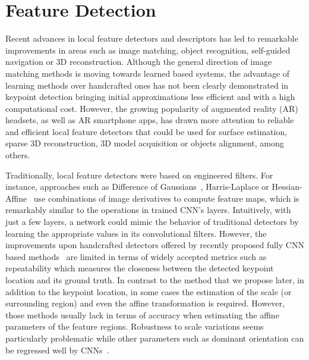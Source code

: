 \section{Feature Detection}
\label{sec:local_detectors}

Recent advances in local feature detectors and descriptors has led to remarkable improvements in areas such as image matching, object recognition, self-guided navigation or 3D reconstruction. Although the general direction of image matching methods is moving towards learned based systems, the advantage of learning methods over handcrafted ones has not been clearly demonstrated in keypoint detection \cite{Karel_Vedaldi_BMVC_18} bringing initial approximations less efficient and with a high computational cost.
However, the growing popularity of augmented reality (AR) headsets, as well as AR smartphone apps, has drawn more attention to reliable and efficient local feature detectors that could be used for surface estimation, sparse 3D reconstruction, 3D model acquisition or objects alignment, among others. \par

Traditionally, local feature detectors were based on engineered filters. For instance, approaches such as Difference of Gaussians~\cite{SIFT}, Harris-Laplace or Hessian-Affine~\cite{mikolajczykIJCV2004} use combinations of image derivatives to compute feature maps, which is remarkably similar to the operations in trained CNN's layers. Intuitively, with just a few layers, a network could mimic the behavior of traditional detectors by learning the appropriate values in its convolutional filters. However, the improvements upon handcrafted detectors offered by recently proposed fully CNN based methods~\cite{LIFT,DeTone_MagicPoint17,Karel_Vedaldi_ECCV_16, Zhang_Felix_CVPR_17,OnoSerra18} are limited in terms of widely accepted metrics such as repeatability which measures the closeness between the detected keypoint location and its ground truth. In contrast to the method that we propose later, in addition to the keypoint location, in some cases the estimation of the scale (or surrounding region) and even the affine transformation is required. However, those methods usually lack in terms of accuracy when estimating the affine parameters of the feature regions. Robustness to scale variations seems particularly problematic while other parameters such as dominant orientation can be regressed well by CNNs~\cite{Yi_Verdie_Fua_Lepetit_CVPR16, LIFT}.

